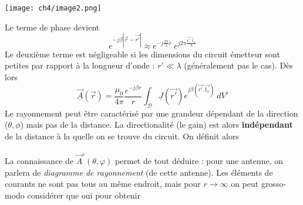 \begin{center}
	\texttt{[image: ch4/image2.png]}
\end{center}

	Le terme de phase devient
	\begin{equation}
	e^{-j\beta|\vec{r}-\vec{r'}|} \approx e^{-j\frac{2\pi}{\lambda}r}\ e^{j2\pi\frac{\vec{r'}.\vec{1}_r}{
	\lambda}}
	\end{equation}
	Le deuxième terme est négligeable si les dimensions du circuit émetteur sont petites par rapport 
	à la longueur d'onde : $r' \ll \lambda$ (généralement pas le cas). Dès lors
	\begin{equation}
	\underline{\vec{A}}(\vec{r}) = \dfrac{\mu_0}{4\pi}\dfrac{e^{-j\beta r}}{r}\int_\mathcal{D}
	\underline{J}(\vec{r'})e^{j\beta(\vec{r'}.\vec{1_r})}\ dV'
	\end{equation}
	Le rayonnement peut être caractérisé par une grandeur dépendant de la direction ($\theta,\phi$) 
	mais pas de la distance. La directionalité (le gain) est alors \textbf{indépendant} de la 
	distance à la quelle on se trouve du circuit. On définit alors\\
	
	\ \\
	
	La connaissance de $\vec{A}^\circ(\theta,\varphi)$ permet de tout déduire : pour une antenne, 
	on parlera de \textit{diagramme de rayonnement} (de cette antenne). Les éléments de courants 
	ne sont pas tous au même endroit, mais pour $r\rightarrow\infty$ on peut grosso-modo considérer 
	que oui pour obtenir\\
	\ 
	
